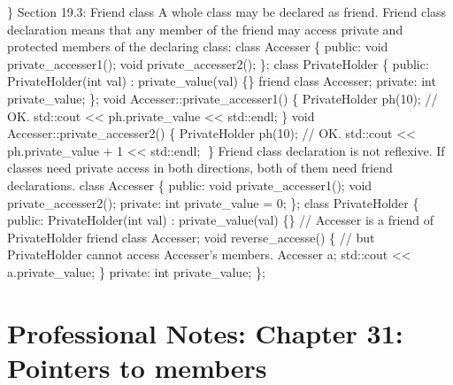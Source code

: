 \} Section 19.3: Friend class A whole class may be declared as friend.
Friend class declaration means that any member of the friend may access
private and protected members of the declaring class: class Accesser \{
public: void private\_accesser1(); void private\_accesser2(); \}; class
PrivateHolder \{ public: PrivateHolder(int val) : private\_value(val)
\{\} friend class Accesser; private: int private\_value; \}; void
Accesser::private\_accesser1() \{ PrivateHolder ph(10); // OK. std::cout
\textless\textless{} ph.private\_value \textless\textless{} std::endl;
\} void Accesser::private\_accesser2() \{ PrivateHolder ph(10); // OK.
std::cout \textless\textless{} ph.private\_value + 1
\textless\textless{} std::endl; \} Friend class declaration is not
reﬂexive. If classes need private access in both directions, both of
them need friend declarations. class Accesser \{ public: void
private\_accesser1(); void private\_accesser2(); private: int
private\_value = 0; \}; class PrivateHolder \{ public: PrivateHolder(int
val) : private\_value(val) \{\} // Accesser is a friend of PrivateHolder
friend class Accesser; void reverse\_accesse() \{ // but PrivateHolder
cannot access Accesser's members. Accesser a; std::cout
\textless\textless{} a.private\_value; \} private: int private\_value;
\};

\hypertarget{professional-notes-chapter-31-pointers-to-members-1}{%
\chapter{Professional Notes: Chapter 31: Pointers to
members}\label{professional-notes-chapter-31-pointers-to-members-1}}

